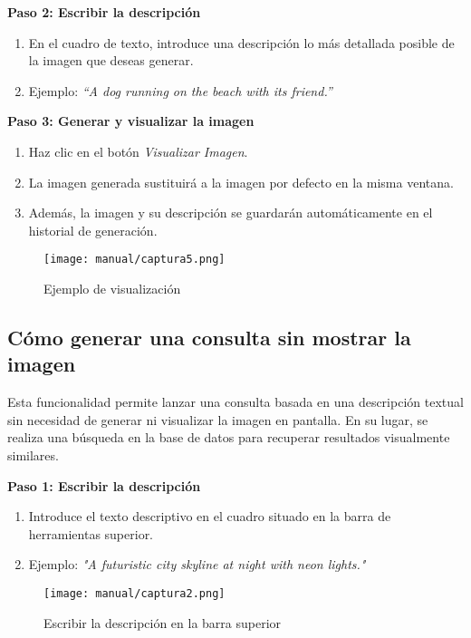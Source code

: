 \textbf{Paso 2: Escribir la descripción}
\begin{enumerate}
    \item En el cuadro de texto, introduce una descripción lo más detallada posible de la imagen que deseas generar.
    \item Ejemplo: \textit{``A dog running on the beach with its friend.''}
\end{enumerate}

\textbf{Paso 3: Generar y visualizar la imagen}
\begin{enumerate}
    \item Haz clic en el botón \textit{Visualizar Imagen}.
    \item La imagen generada sustituirá a la imagen por defecto en la misma ventana.
    \item Además, la imagen y su descripción se guardarán automáticamente en el historial de generación.
\end{enumerate}

\begin{figure}[H]
    \centering
    \texttt{[image: manual/captura5.png]}
    \caption{Ejemplo de visualización}
    \label{fig:ejemplo}
\end{figure}


\subsection{Cómo generar una consulta sin mostrar la imagen}

Esta funcionalidad permite lanzar una consulta basada en una descripción textual sin necesidad de generar ni visualizar la imagen en pantalla. En su lugar, se realiza una búsqueda en la base de datos para recuperar resultados visualmente similares.

\textbf{Paso 1: Escribir la descripción}
\begin{enumerate}
    \item Introduce el texto descriptivo en el cuadro situado en la barra de herramientas superior.
    \item Ejemplo: \textit{"A futuristic city skyline at night with neon lights."}
\end{enumerate}

\begin{figure}[H]
    \centering
    \texttt{[image: manual/captura2.png]}
    \caption{Escribir la descripción en la barra superior}
    \label{fig:consulta-cuadro}
\end{figure}

